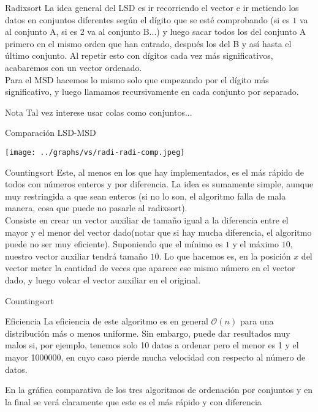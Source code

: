 \documentclass[compress]{beamer}
\begin{document}
\begin{frame}{Radixsort}
La idea general del LSD es ir recorriendo el vector e ir metiendo los datos en conjuntos diferentes según el dígito que se esté comprobando (si es $1$ va al conjunto A, si es $2$ va al conjunto B...) y luego sacar todos los del conjunto A primero en el mismo orden que han entrado, después los del B y así hasta el último conjunto. Al repetir esto con dígitos cada vez más significativos, acabaremos con un vector ordenado.\\
\vspace{0.20in}
Para el MSD hacemos lo mismo solo que empezando por el dígito más significativo, y luego llamamos recursivamente en cada conjunto por separado.\\
	\begin{exampleblock}{Nota}
	Tal vez interese usar colas como conjuntos...
	\end{exampleblock}
\end{frame}

\begin{frame}{Comparación LSD-MSD}
	\begin{alertblock}{}
		\begin{center}
		\texttt{[image: ../graphs/vs/radi-radi-comp.jpeg]}
		\end{center}
	\end{alertblock}
\end{frame}

\begin{frame}{Countingsort}
Este, al menos en los que hay implementados, es el más rápido de todos con números enteros y por diferencia. La idea es sumamente simple, aunque muy restringida a que sean enteros (si no lo son, el algoritmo falla de mala manera, cosa que puede no pasarle al radixsort).\\
\vspace{0.20in}
Consiste en crear un vector auxiliar de tamaño igual a la diferencia entre el mayor y el menor del vector dado(notar que si hay mucha diferencia, el algoritmo puede no ser muy eficiente). Suponiendo que el mínimo es $1$ y el máximo $10$, nuestro vector auxiliar tendrá tamaño $10$. Lo que hacemos es, en la posición $x$ del vector meter la cantidad de veces que aparece ese mismo número en el vector dado, y luego volcar el vector auxiliar en el original.
\end{frame}

\begin{frame}{Countingsort}
	\begin{block}{Eficiencia}
	La eficiencia de este algoritmo es en general $\mathcal{O}(n)$ para una distribución más o menos uniforme. Sin embargo, puede dar resultados muy malos si, por ejemplo, tenemos solo 10 datos a ordenar pero el menor es 1 y el mayor 1000000, en cuyo caso pierde mucha velocidad con respecto al número de datos.
	\end{block}
\vspace{0.20in}
En la gráfica comparativa de los tres algoritmos de ordenación por conjuntos y en la final se verá claramente que este es el más rápido y con diferencia
\end{frame}
\end{document}
